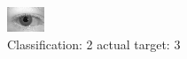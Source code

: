 \begin{figure}[h!]
\begin{center}
\includegraphics[width=0.60\columnwidth]{figures/ID602_class_2_target_3.png}
\end{center}
\caption{ Classification: 2 actual target: 3}
\label{fig:ID602_class_2_target_3}
\end{figure}

